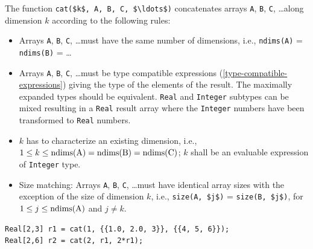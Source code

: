 The function \lstinline!cat($k$, A, B, C, $\ldots$)! concatenates arrays \lstinline!A!, \lstinline!B!, \lstinline!C!, \ldots along dimension $k$ according to the following rules:
\begin{itemize}
\item
  Arrays \lstinline!A!, \lstinline!B!, \lstinline!C!, \ldots must have the same number of dimensions, i.e., \lstinline!ndims(A)! = \lstinline!ndims(B)! = \ldots
\item
  Arrays \lstinline!A!, \lstinline!B!, \lstinline!C!, \ldots must be type compatible expressions (\cref{type-compatible-expressions}) giving the type of the elements of the result.
The maximally expanded types should be equivalent.
  \lstinline!Real! and \lstinline!Integer! subtypes can be mixed resulting in a \lstinline!Real! result array where the \lstinline!Integer! numbers have been transformed to \lstinline!Real! numbers.
\item
  $k$ has to characterize an existing dimension, i.e., $1 \leq k \leq \text{\lstinline!ndims(A)!} = \text{\lstinline!ndims(B)!} = \text{\lstinline!ndims(C)!}$; $k$ shall be an evaluable expression of \lstinline!Integer! type.
\item
  Size matching: Arrays \lstinline!A!, \lstinline!B!, \lstinline!C!, \ldots must have identical array sizes with the exception of the size of dimension $k$, i.e., \lstinline!size(A, $j$)! = \lstinline!size(B, $j$)!, for $1 \leq j \leq \text{\lstinline!ndims(A)!}$ and $j \neq k$.
\end{itemize}

\begin{example}
\begin{lstlisting}[language=modelica]
Real[2,3] r1 = cat(1, {{1.0, 2.0, 3}}, {{4, 5, 6}});
Real[2,6] r2 = cat(2, r1, 2*r1);
\end{lstlisting}
\end{example}


